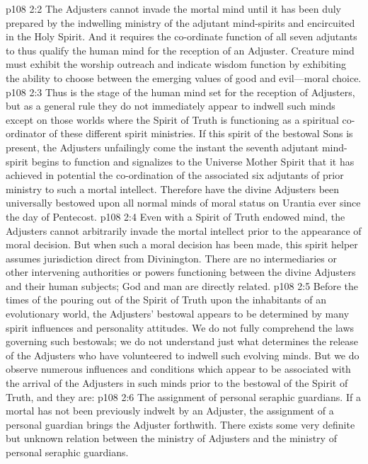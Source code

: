 \pc \vs p108 2:2 The Adjusters cannot invade the mortal mind until it has been duly prepared by the indwelling ministry of the adjutant mind\hyp{}spirits and encircuited in the Holy Spirit. And it requires the co\hyp{}ordinate function of all seven adjutants to thus qualify the human mind for the reception of an Adjuster. Creature mind must exhibit the worship outreach and indicate wisdom function by exhibiting the ability to choose between the emerging values of good and evil---moral choice.
\vs p108 2:3 Thus is the stage of the human mind set for the reception of Adjusters, but as a general rule they do not immediately appear to indwell such minds except on those worlds where the Spirit of Truth is functioning as a spiritual co\hyp{}ordinator of these different spirit ministries. If this spirit of the bestowal Sons is present, the Adjusters unfailingly come the instant the seventh adjutant mind\hyp{}spirit begins to function and signalizes to the Universe Mother Spirit that it has achieved in potential the co\hyp{}ordination of the associated six adjutants of prior ministry to such a mortal intellect. Therefore have the divine Adjusters been universally bestowed upon all normal minds of moral status on Urantia ever since the day of Pentecost.
\vs p108 2:4 Even with a Spirit of Truth endowed mind, the Adjusters cannot arbitrarily invade the mortal intellect prior to the appearance of moral decision. But when such a moral decision has been made, this spirit helper assumes jurisdiction direct from Divinington. There are no intermediaries or other intervening authorities or powers functioning between the divine Adjusters and their human subjects; God and man are directly related.
\vs p108 2:5 Before the times of the pouring out of the Spirit of Truth upon the inhabitants of an evolutionary world, the Adjusters’ bestowal appears to be determined by many spirit influences and personality attitudes. We do not fully comprehend the laws governing such bestowals; we do not understand just what determines the release of the Adjusters who have volunteered to indwell such evolving minds. But we do observe numerous influences and conditions which appear to be associated with the arrival of the Adjusters in such minds prior to the bestowal of the Spirit of Truth, and they are:
\pc \vs p108 2:6 \bibnobreakspace The assignment of personal seraphic guardians. If a mortal has not been previously indwelt by an Adjuster, the assignment of a personal guardian brings the Adjuster forthwith. There exists some very definite but unknown relation between the ministry of Adjusters and the ministry of personal seraphic guardians.
